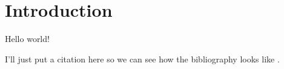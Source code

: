 \chapter{Introduction}

Hello world!

I'll just put a citation here so we can see how the bibliography looks like \cite{rogge1989brauchen}.

\Blindtext